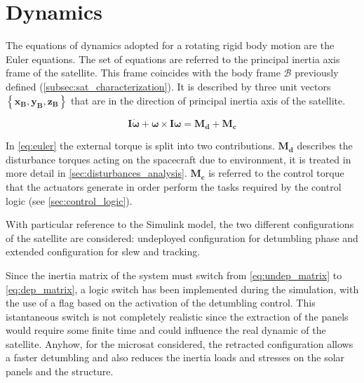 \section{Dynamics}
\label{sec:dynamics}

The equations of dynamics adopted for a rotating rigid body motion are the Euler equations. The set of equations are referred to the principal inertia axis frame of the satellite. This frame coincides with the body frame $\mathcal{B}$ previously defined (\autoref{subsec:sat_characterization}). It is described by three unit vectors $\left\{ \boldsymbol{x_B}, \boldsymbol{y_B}, \boldsymbol{z_B} \right\}$ that are in the direction of principal inertia axis of the satellite.

\begin{equation} \label{eq:euler}
    \boldsymbol{I \dot{\omega}} + \boldsymbol{\omega} \times \boldsymbol{I \omega} = \boldsymbol{M_d} + \boldsymbol{M_c}
\end{equation}

In \autoref{eq:euler} the external torque is split into two contributions.
$\boldsymbol{M_d}$ describes the disturbance torques acting on the spacecraft due to environment, it is treated in more detail in \autoref{sec:disturbances_analysis}.
$\boldsymbol{M_c}$ is referred to the control torque that the actuators generate in order perform the tasks required by the control logic (see \autoref{sec:control_logic}).

With particular reference to the Simulink model, the two different configurations of the satellite are considered: undeployed configuration for detumbling phase and extended configuration for slew and tracking.

Since the inertia matrix of the system must switch from \autoref{eq:undep_matrix} to \autoref{eq:dep_matrix}, a logic switch has been implemented during the simulation, with the use of a flag based on the activation of the detumbling control.
This istantaneous switch is not completely realistic since the extraction of the panels would require some finite time and could influence the real dynamic of the satellite. Anyhow, for the microsat considered, the retracted configuration allows a faster detumbling and also reduces the inertia loads and stresses on the solar panels and the structure.